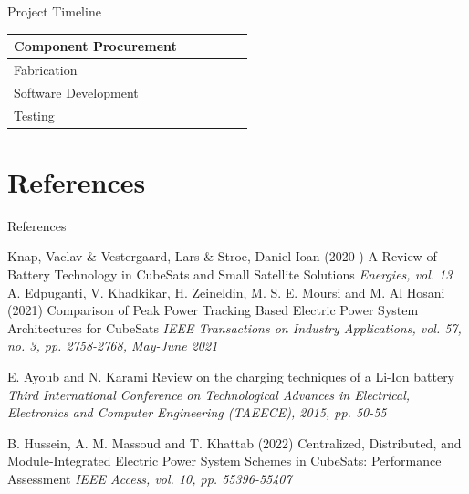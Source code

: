\documentclass[aspectratio=169]{beamer}
\begin{document}
\begin{frame}{Project Timeline}
\begin{table}[]
\begin{tabular}{|l|l|l|l|l|l|}
				Component Procurement &                          &                          &                          & \cellcolor[HTML]{93C47D} &                          \\ \hline
				Fabrication           &                          &                          &                          & \cellcolor[HTML]{93C47D} & \cellcolor[HTML]{93C47D} \\ \hline
				Software Development  &                          &                          &                          & \cellcolor[HTML]{93C47D} & \cellcolor[HTML]{93C47D} \\ \hline
				Testing               &                          &                          &                          &                          & \cellcolor[HTML]{93C47D} \\ \hline
			\end{tabular}
		\end{table}
		
	\end{frame}
	
	
	\section{References}
	\begin{frame}[allowframebreaks]{References}
		
		\begin{thebibliography}{9}
			
			Knap, Vaclav \& Vestergaard, Lars \& Stroe, Daniel-Ioan (2020	)
			\newblock A Review of Battery Technology in CubeSats
			and Small Satellite Solutions
			\newblock \emph{Energies, vol. 13}	
			A. Edpuganti, V. Khadkikar, H. Zeineldin, M. S. E. Moursi and M. Al Hosani (2021)
			\newblock Comparison of Peak Power Tracking Based Electric Power System Architectures for CubeSats
			\newblock \emph{IEEE Transactions on Industry Applications, vol. 57, no. 3, pp. 2758-2768, May-June 2021}
			
			E. Ayoub and N. Karami 
			\newblock Review on the charging techniques of a Li-Ion battery
			\newblock \emph{Third International Conference on Technological Advances in Electrical, Electronics and Computer Engineering (TAEECE), 2015, pp. 50-55}
			
			
			
			B. Hussein, A. M. Massoud and T. Khattab (2022)
			\newblock Centralized, Distributed, and Module-Integrated Electric Power System Schemes in CubeSats: Performance Assessment
			\newblock \emph{ IEEE Access, vol. 10, pp. 55396-55407}
			
			
			
			
			
			
			
			
		\end{thebibliography}
	\end{frame}
	
	\begin{frame}
		
		
	\end{frame}
\end{document}
